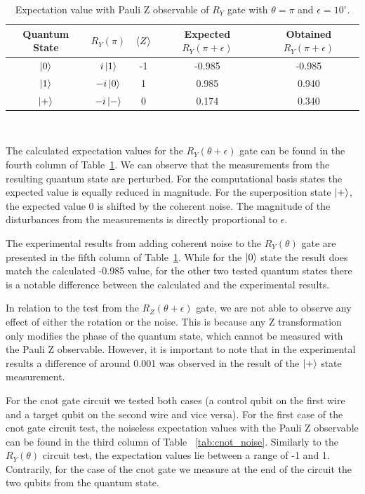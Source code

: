 \begin{table}[h]
  \centering
  \begin{tabular}{|c|c|c|c|c|}
    \hline
    Quantum State & \(R_{Y}\left(\pi\right)\) & \(\expval{Z}\) & Expected \(R_{Y}\left(\pi+\epsilon\right)\) & Obtained \(R_{Y}\left(\pi+\epsilon\right)\) \\
    \hline
    \(\ket{0}\) & \(i\ket{1}\)  & -1 & -0.985 & -0.985 \\
    \hline
    \(\ket{1}\) & \(-i\ket{0}\) &  1 &  0.985 &  0.940 \\
    \hline
    \(\ket{+}\) & \(-i\ket{-}\) &  0 &  0.174 &  0.340 \\
    \hline
  \end{tabular}
  \caption{Expectation value with Pauli Z observable of \(R_{Y}\) gate with \(\theta = \pi\) and \(\epsilon = 10^{\circ}\).}\label{tab:ry_noise}
\end{table} \

The calculated expectation values for the \(R_{Y}(\theta + \epsilon)\) gate
can be found in the fourth column of Table~\ref{tab:ry_noise}. We can
observe that the measurements from the resulting quantum state are
perturbed. For the computational basis states the expected value is
equally reduced in magnitude. For the superposition state \(\ket{+}\),
the expected value 0 is shifted by the coherent noise. The magnitude
of the disturbances from the measurements is directly proportional to
\(\epsilon\). \

The experimental results from adding coherent noise to the
\(R_{Y}(\theta)\) gate are presented in the fifth column of Table~\ref{tab:ry_noise}. 
While for the \(\ket{0}\) state the result does match the calculated
-0.985 value, for the other two tested quantum states there is a
notable difference between the calculated and the experimental results. \

In relation to the test from the \(R_{Z}(\theta + \epsilon)\) gate, we
are not able to observe any effect of either the rotation or the noise.
This is because any Z transformation only modifies the phase of the
quantum state, which cannot be measured with the Pauli Z observable.
However, it is important to note that in the experimental results
a difference of around 0.001 was observed in the result of the \(\ket{+}\)
state measurement. \

For the \ac{cnot} gate circuit we tested both cases (a control qubit on the
first wire and a target qubit on the second wire and vice versa). For
the first case of the \ac{cnot}  gate circuit test, the noiseless expectation
values with the Pauli Z observable can be found in the third column of Table
~\ref{tab:cnot_noise}. Similarly to the \(R_{Y}(\theta)\) circuit test,
the expectation values lie between a range of -1 and 1. Contrarily,
for the case of the \ac{cnot}  gate we measure at the end of the circuit the
two qubits from the quantum state. \


